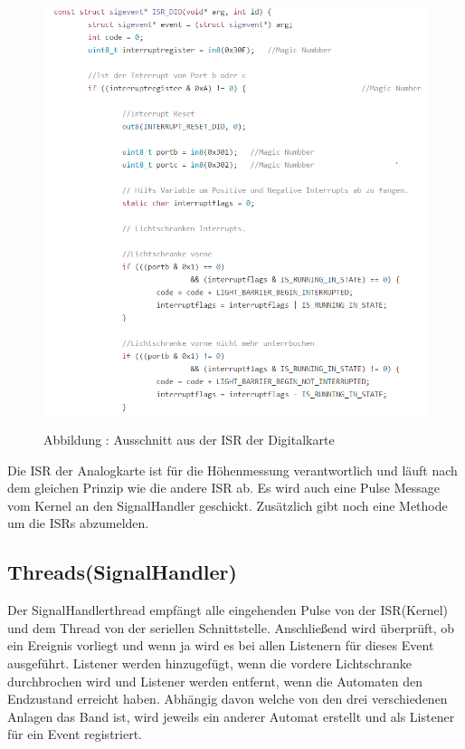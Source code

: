 \documentclass[a4paper, 11pt]{article}
\begin{document}
\begin{figure}[h]
\centering 
    \includegraphics[scale=0.7]{ISR/isrdig.png}
    
    \small Abbildung \theimgcounter : Ausschnitt aus der ISR der Digitalkarte
    \label{isrdig}
\end{figure}

Die ISR der Analogkarte ist für die Höhenmessung verantwortlich und läuft nach dem gleichen Prinzip wie die andere ISR ab. Es wird auch eine Pulse Message vom Kernel an den SignalHandler geschickt. Zusätzlich gibt noch eine Methode um die ISRs abzumelden.

\newpage

\subsection{Threads(SignalHandler)}
Der SignalHandlerthread empfängt alle eingehenden Pulse von der ISR(Kernel) und dem Thread von der seriellen Schnittstelle. Anschließend wird überprüft, ob ein Ereignis vorliegt und wenn ja wird es bei allen Listenern für dieses Event ausgeführt. Listener werden hinzugefügt, wenn die vordere Lichtschranke durchbrochen wird und Listener werden entfernt, wenn die Automaten den Endzustand erreicht haben. Abhängig davon welche von den drei verschiedenen Anlagen das Band ist, wird jeweils ein anderer Automat erstellt und als Listener für ein Event registriert.
\end{document}
